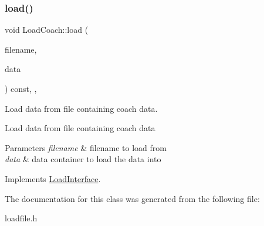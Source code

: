 \subsubsection{\texorpdfstring{load()}{load()}}
{\footnotesize\ttfamily void Load\+Coach\+::load (\begin{DoxyParamCaption}\item[{std\+::string}]{filename,  }\item[{\mbox{\hyperlink{classFileDataContainer}{File\+Data\+Container}} $\ast$}]{data }\end{DoxyParamCaption}) const\hspace{0.3cm}{\ttfamily [inline]}, {\ttfamily [override]}, {\ttfamily [virtual]}}



Load data from file containing coach data. 

Load data from file containing coach data 
\begin{DoxyParams}{Parameters}
{\em filename} & filename to load from \\
\hline
{\em data} & data container to load the data into \\
\hline
\end{DoxyParams}


Implements \mbox{\hyperlink{classLoadInterface_a91bdc01550e64219c4007afce054fd40}{Load\+Interface}}.



The documentation for this class was generated from the following file\+:\begin{DoxyCompactItemize}
\item 
loadfile.\+h\end{DoxyCompactItemize}
